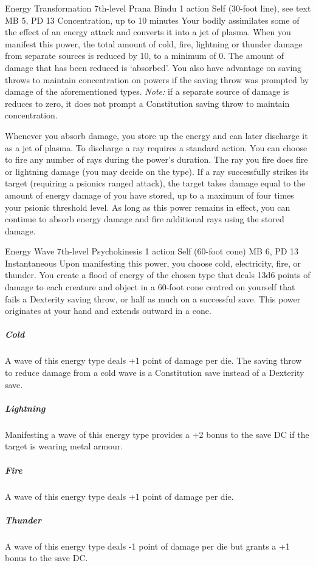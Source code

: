 \DndPowerHeader%
  {Energy Transformation}
  {7th-level Prana Bindu}
  {1 action}
  {Self (30-foot line), see text}
  {MB 5, PD 13}
  {Concentration, up to 10 minutes}
  Your bodily assimilates some of the effect of an
  energy attack and converts it into a jet of plasma.
  When you manifest this power,
  the total amount of cold, fire,
  lightning or thunder damage
  from separate sources is reduced by 10,
  to a minimum of 0.
  The amount of damage that has been reduced
  is `absorbed'.
  You also have advantage on saving throws to
  maintain concentration on powers if the
  saving throw was prompted by damage of the
  aforementioned types.
  \emph{Note:} if a separate source of damage is
  reduces to zero, it does not prompt a Constitution
  saving throw to maintain concentration.
  
  Whenever you absorb damage,
  you store up the energy and can later discharge it
  as a jet of plasma.
  To discharge a ray requires a standard action.
  You can choose to fire any number of rays
  during the power's duration.
  The ray you fire does fire or lightning damage
  (you may decide on the type).
  If a ray successfully strikes its target
  (requiring a psionics ranged attack),
  the target takes damage equal to the amount of energy damage
  of you have stored,
  up to a maximum of four times your psionic threshold level.
  As long as this power remains in effect,
  you can continue to absorb energy damage and
  fire additional rays using the stored damage.

\DndPowerHeader%
  {Energy Wave}
  {7th-level Psychokinesis}
  {1 action}
  {Self (60-foot cone)}
  {MB 6, PD 13}
  {Instantaneous}
  Upon manifesting this power,
  you choose cold, electricity, fire, or thunder.
  You create a flood of energy of the chosen type
  that deals 13d6 points of damage
  to each creature and object in a 60-foot cone
  centred on yourself
  that fails a Dexterity saving throw,
  or half as much on a successful save.
  This power originates at your hand
  and extends outward in a cone.
  \subparagraph{Cold}
    A wave of this energy type deals +1 point
    of damage per die.
    The saving throw to reduce damage from a cold wave
    is a Constitution save instead of a Dexterity save.  
  \subparagraph{Lightning}
    Manifesting a wave of this energy type
    provides a +2 bonus to the save DC if the target is wearing
    metal armour.
  \subparagraph{Fire}
    A wave of this energy type deals +1 point of damage per die.
  \subparagraph{Thunder}
    A wave of this energy type deals -1 point of damage per die
    but grants a +1 bonus to the save DC.

